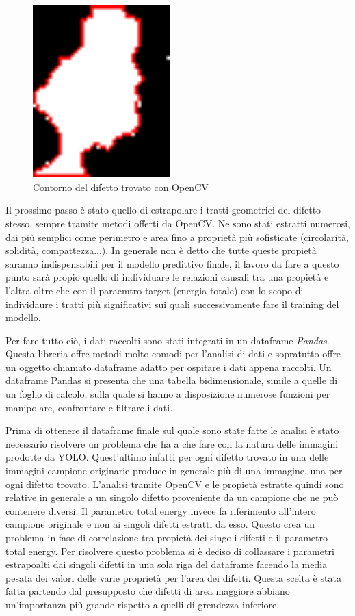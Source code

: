 \documentclass[12pt,a4paper,openright,twoside]{report}
\begin{document}
\begin{figure}[h]
\centering
\includegraphics[width=200px,keepaspectratio]{graphene_67_bonds_cropped_box_1_thresh_countour_.png}
\caption{Contorno del difetto trovato con OpenCV}
\end{figure}
Il prossimo passo è stato quello di estrapolare i tratti geometrici del difetto stesso, sempre tramite metodi offerti da OpenCV. Ne sono stati estratti numerosi, dai più semplici come perimetro e area fino a proprietà più sofisticate (circolarità, solidità, compattezza...).
In generale non è detto che tutte queste propietà saranno indispensabili per il modello predittivo finale, il lavoro da fare a questo punto sarà propio quello di individuare le relazioni causali tra una propietà e l'altra oltre che con il paraemtro target (energia totale) con lo scopo di individaure i tratti più significativi sui quali successivamente fare il training del modello.

Per fare tutto ciò, i dati raccolti sono stati integrati in un dataframe \emph{Pandas}. Questa libreria offre metodi molto comodi per l'analisi di dati e sopratutto offre un oggetto chiamato dataframe adatto per ospitare i dati appena raccolti. 
Un dataframe Pandas si presenta che una tabella bidimensionale, simile a quelle di un foglio di calcolo, sulla quale si hanno a disposizione numerose funzioni per manipolare, confrontare e filtrare i dati. 

Prima di ottenere il dataframe finale sul quale sono state fatte le analisi è stato necessario risolvere un problema che ha a che fare con la natura delle immagini prodotte da YOLO. Quest'ultimo infatti per ogni difetto trovato in una delle immagini campione originarie produce in generale più di una immagine, una per ogni difetto trovato. L'analisi tramite OpenCV e le propietà estratte quindi sono relative in generale a un singolo difetto proveniente da un campione che ne può contenere diversi. Il parametro total energy invece fa riferimento all'intero campione originale e non ai singoli difetti estratti da esso. Questo crea un problema in fase di correlazione tra propietà dei singoli difetti e il  parametro total energy. 
Per risolvere questo problema si è deciso di collassare i parametri estrapoalti dai singoli difetti in una sola riga del dataframe facendo la media pesata dei valori delle varie proprietà per l'area dei difetti. 
Questa scelta è stata fatta partendo dal presupposto che difetti di area maggiore abbiano un'importanza più grande rispetto a quelli di grendezza inferiore. 
\end{document}
